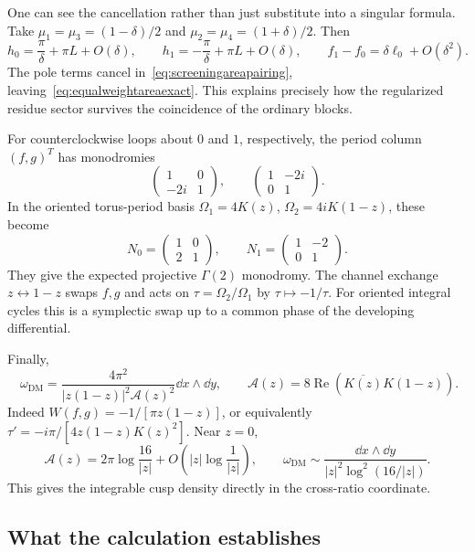 One can see the cancellation rather than just substitute
into a singular formula. Take
$\mu_1=\mu_3=(1-\delta)/2$ and
$\mu_2=\mu_4=(1+\delta)/2$. Then
\[
 h_0=\frac\pi\delta+\pi L+O(\delta),\qquad
 h_1=-\frac\pi\delta+\pi L+O(\delta),\qquad
 f_1-f_0=\delta\ell_0+O(\delta^2).
\]
The pole terms cancel in~\eqref{eq:screeningareapairing},
leaving~\eqref{eq:equalweightareaexact}. This explains
precisely how the regularized residue sector survives the
coincidence of the ordinary blocks.

For counterclockwise loops about $0$ and $1$, respectively,
the period column $(f,g)^T$ has monodromies
\[
 \begin{pmatrix}1&0\\-2i&1\end{pmatrix},\qquad
 \begin{pmatrix}1&-2i\\0&1\end{pmatrix}.
\]
In the oriented torus-period basis
$\Omega_1=4K(z)$, $\Omega_2=4iK(1-z)$, these become
\begin{equation}
 N_0=\begin{pmatrix}1&0\\2&1\end{pmatrix},\qquad
 N_1=\begin{pmatrix}1&-2\\0&1\end{pmatrix}.
 \label{eq:equalweightmonodromy}
\end{equation}
They give the expected projective $\Gamma(2)$ monodromy.
The channel exchange $z\leftrightarrow1-z$ swaps $f,g$ and
acts on $\tau=\Omega_2/\Omega_1$ by $\tau\mapsto-1/\tau$.
For oriented integral cycles this is a symplectic swap up
to a common phase of the developing differential.

Finally,
\begin{equation}
 \boxed{\quad
 \omega_{\mathrm{DM}}
 =\frac{4\pi^2}{|z(1-z)|^2\mathcal A(z)^2}\dd x\wedge\dd y,
 \qquad
 \mathcal A(z)=8\operatorname{Re}(\overline{K(z)}K(1-z)).
 \quad}
 \label{eq:equalweightdensityexplicit}
\end{equation}
Indeed $W(f,g)=-1/[\pi z(1-z)]$, or equivalently
$\tau'=-i\pi/[4z(1-z)K(z)^2]$.
Near $z=0$,
\[
 \mathcal A(z)=2\pi\log\frac{16}{|z|}
          +O\left(|z|\log\frac1{|z|}\right),\qquad
 \omega_{\mathrm{DM}}\sim
 \frac{\dd x\wedge\dd y}
      {|z|^2\log^2(16/|z|)}.
\]
This gives the integrable cusp density directly in the
cross-ratio coordinate.

\subsection{What the calculation establishes}

